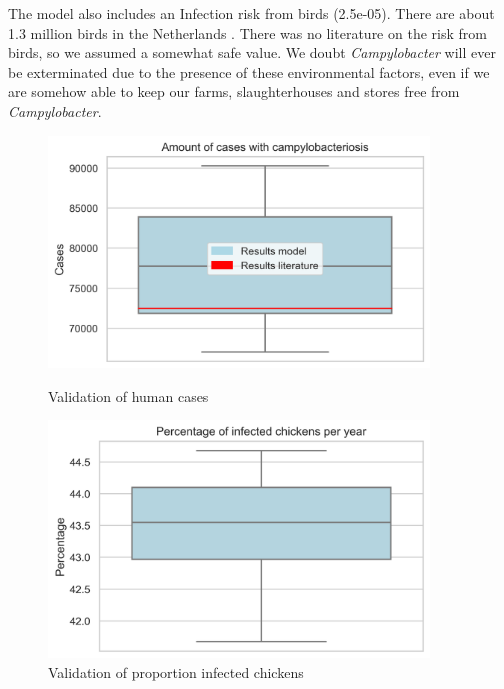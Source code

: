 The model also includes an Infection risk from birds (2.5e-05). There are about 1.3 million birds in the Netherlands \parencite{noauthor_miljoenen_2019}. There was no literature on the risk from birds, so we assumed a somewhat safe value. We doubt \textit{Campylobacter} will ever be exterminated due to the presence of these environmental factors, even if we are somehow able to keep our farms, slaughterhouses and stores free from \textit{Campylobacter}.


\begin{figure}[!h]
    \centering
    \begin{minipage}{0.45\textwidth}
        \centering
        \includegraphics[width=0.9\textwidth]{notebooks/human_cases2.png} %
        \caption{Validation of human cases}
        \label{fig:val_human_cases}
    \end{minipage}\hfill
    \begin{minipage}{0.45\textwidth}
        \centering
        \includegraphics[width=0.9\textwidth]{notebooks/chickens2.png} %
        \caption{Validation of proportion infected chickens}
	    \label{fig:val_chickens}
    \end{minipage}
\end{figure}

